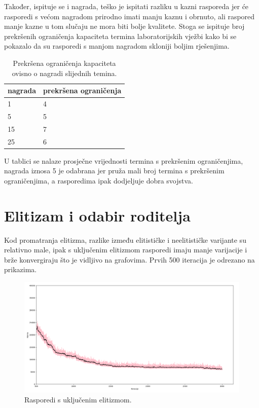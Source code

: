 \documentclass[times, utf8, zavrsni]{fer}
\begin{document}
Također, ispituje se i nagrada, teško je ispitati razliku u kazni rasporeda jer će rasporedi s većom nagradom prirodno imati manju kaznu i obrnuto, ali raspored manje kazne u tom slučaju ne mora biti bolje kvalitete. Stoga se ispituje broj prekršenih ograničenja kapaciteta termina laboratorijskih vježbi kako bi se pokazalo da su rasporedi s manjom nagradom skloniji boljim rješenjima.

\begin{table}[htb]
\caption{Prekršena ograničenja kapaciteta ovisno o nagradi slijednih temina.}
\label{tbl:nagrada}
\centering
\begin{tabular}{ll} \hline
nagrada &  prekršena ograničenja\\ \hline
1 & 4  \\
5 & 5 \\
15  & 7 \\
25 & 6 \\ \hline
\end{tabular}
\end{table}

U tablici se nalaze prosječne vrijednosti termina s prekršenim ograničenjima, nagrada iznosa 5 je odabrana jer pruža mali broj termina s prekršenim ograničenjima, a rasporedima ipak dodjeljuje dobra svojstva.

\section{Elitizam i odabir roditelja}

Kod promatranja elitizma, razlike između elitističke i neelitističke varijante su relativno male, ipak s uključenim elitizmom rasporedi imaju manje varijacije i brže konvergiraju što je vidljivo na grafovima. Prvih 500 iteracija je odrezano na prikazima.

\begin{figure}[htb]
\centering
\includegraphics[width=14cm]{images/usp_elitizam_da.png}
\caption{Rasporedi s uključenim elitizmom.}
\label{fig:usp_elitizam_da}
\end{figure}
\end{document}
